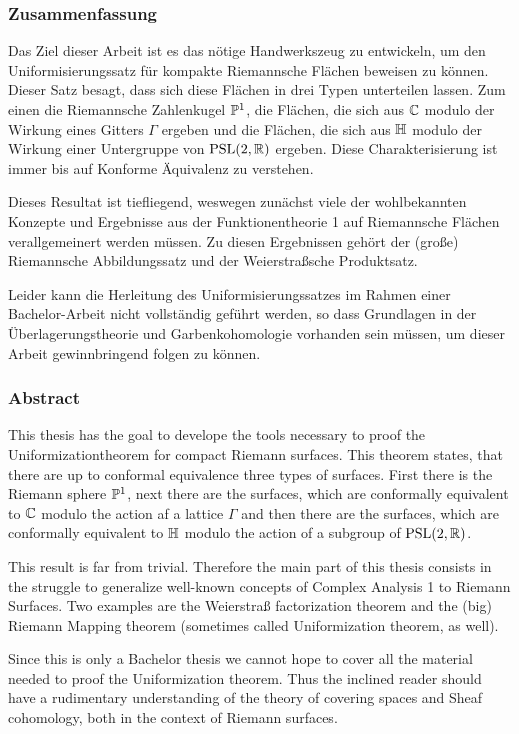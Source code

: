 
\subsubsection*{Zusammenfassung}
\label{sec:Zusammenfassung}

Das Ziel dieser Arbeit ist es das nötige Handwerkszeug zu
entwickeln, um den Uniformisierungssatz für kompakte Riemannsche
Flächen beweisen zu können. Dieser Satz besagt, dass sich diese
Flächen in drei Typen unterteilen lassen. Zum einen die Riemannsche
Zahlenkugel $\P^1$, die Flächen, die sich aus $\C$ modulo der
Wirkung eines Gitters $\Gamma$ ergeben und die Flächen, die sich aus
$\h$ modulo der Wirkung einer Untergruppe von $\PSL(2, \R)$
ergeben. Diese Charakterisierung ist immer bis auf Konforme
Äquivalenz zu verstehen.

Dieses Resultat ist tiefliegend, weswegen zunächst viele der
wohlbekannten Konzepte und Ergebnisse aus der Funktionentheorie 1 auf
Riemannsche Flächen verallgemeinert werden müssen. Zu diesen
Ergebnissen gehört der (große) Riemannsche Abbildungssatz und der
Weierstraßsche Produktsatz.

Leider kann die Herleitung des Uniformisierungssatzes im Rahmen
einer Bachelor-Arbeit nicht vollständig geführt werden, so dass
Grundlagen in der Überlagerungstheorie und Garbenkohomologie
vorhanden sein müssen, um dieser Arbeit gewinnbringend folgen zu können.

\subsubsection*{Abstract}
\label{sec:abstract}

This thesis has the goal to develope the tools necessary to proof the
Uniformizationtheorem for compact Riemann surfaces. This theorem
states, that there are up to conformal equivalence three types of
surfaces. First there is the Riemann sphere $\P^1$, next there are the
surfaces, which are conformally equivalent to $\C$ modulo the action
af a lattice $\Gamma$ and then there are the surfaces, which are
conformally equivalent to $\h$ modulo the action of a subgroup of
$\PSL(2, \R)$.

This result is far from trivial. Therefore the main part of this
thesis consists in the struggle to generalize well-known concepts of
Complex Analysis 1 to Riemann Surfaces. Two examples are the
Weierstraß factorization theorem and the (big) Riemann Mapping theorem
(sometimes called Uniformization theorem, as well).

Since this is only a Bachelor thesis we cannot hope to cover all the
material needed to proof the Uniformization theorem. Thus the inclined
reader should have a rudimentary understanding of the theory of
covering spaces and Sheaf cohomology, both in the context of Riemann surfaces.

